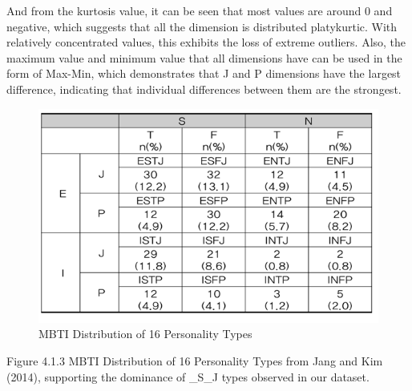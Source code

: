 \documentclass[12pt]{article}
\numberwithin{figure}{section}  %
\begin{document}
	And from the kurtosis value, it can be seen that most values are around 0
	and negative, which suggests that all the dimension is distributed
	platykurtic. With relatively concentrated values, this exhibits the loss of
	extreme outliers. Also, the maximum value and minimum value that all
	dimensions have can be used in the form of Max-Min, which demonstrates that
	J and P dimensions have the largest difference, indicating that individual
	differences between them are the strongest.
	\begin{figure}[H]
		\centering
		\includegraphics{Q1EDA7} 
		\caption{MBTI Distribution of 16 Personality Types}		
	\end{figure}
	
	Figure 4.1.3 MBTI Distribution of 16 Personality Types from Jang and Kim %
	(2014), supporting the dominance of \_S\_J types observed in our dataset. 
	
\end{document}
